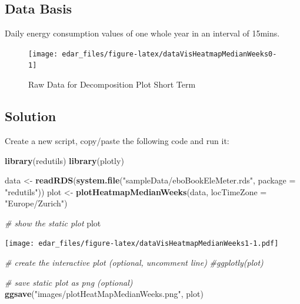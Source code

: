 \documentclass[
  a4paperpaper,
]{book}
\newenvironment{Shaded}{\begin{snugshade}}{\end{snugshade}}
\newcommand{\CommentTok}[1]{\textcolor[rgb]{0.56,0.35,0.01}{\textit{#1}}}
\newcommand{\DataTypeTok}[1]{\textcolor[rgb]{0.13,0.29,0.53}{#1}}
\newcommand{\KeywordTok}[1]{\textcolor[rgb]{0.13,0.29,0.53}{\textbf{#1}}}
\newcommand{\NormalTok}[1]{#1}
\newcommand{\StringTok}[1]{\textcolor[rgb]{0.31,0.60,0.02}{#1}}
\let\oldShaded\Shaded
\let\endoldShaded\endShaded
\renewenvironment{Shaded}{\footnotesize\oldShaded}{\endoldShaded}
\begin{document}
\hypertarget{data-basis-7}{%
\subsection{Data Basis}\label{data-basis-7}}

Daily energy consumption values of one whole year in an interval of 15mins.

\begin{figure}
\texttt{[image: edar\_files/figure-latex/dataVisHeatmapMedianWeeks0-1]} \caption{Raw Data for Decomposition Plot Short Term}\label{fig:dataVisHeatmapMedianWeeks0}
\end{figure}

\newpage

\hypertarget{solution-7}{%
\subsection{Solution}\label{solution-7}}

Create a new script, copy/paste the following code and run it:

\begin{Shaded}
\begin{Highlighting}[]
\KeywordTok{library}\NormalTok{(redutils)}
\KeywordTok{library}\NormalTok{(plotly)}

\NormalTok{data <-}\StringTok{ }\KeywordTok{readRDS}\NormalTok{(}\KeywordTok{system.file}\NormalTok{(}\StringTok{"sampleData/eboBookEleMeter.rds"}\NormalTok{, }\DataTypeTok{package =} \StringTok{"redutils"}\NormalTok{))}
\NormalTok{plot <-}\StringTok{ }\KeywordTok{plotHeatmapMedianWeeks}\NormalTok{(data, }\DataTypeTok{locTimeZone =} \StringTok{"Europe/Zurich"}\NormalTok{)}

\CommentTok{# show the static plot}
\NormalTok{plot}
\end{Highlighting}
\end{Shaded}

\texttt{[image: edar\_files/figure-latex/dataVisHeatmapMedianWeeks1-1.pdf]}

\begin{Shaded}
\begin{Highlighting}[]
\CommentTok{# create the interactive plot (optional, uncomment line)}
\CommentTok{#ggplotly(plot)}
\end{Highlighting}
\end{Shaded}

\begin{Shaded}
\begin{Highlighting}[]
\CommentTok{# save static plot as png (optional)}
\KeywordTok{ggsave}\NormalTok{(}\StringTok{"images/plotHeatMapMedianWeeks.png"}\NormalTok{, plot)}
\end{Highlighting}
\end{Shaded}
\end{document}
